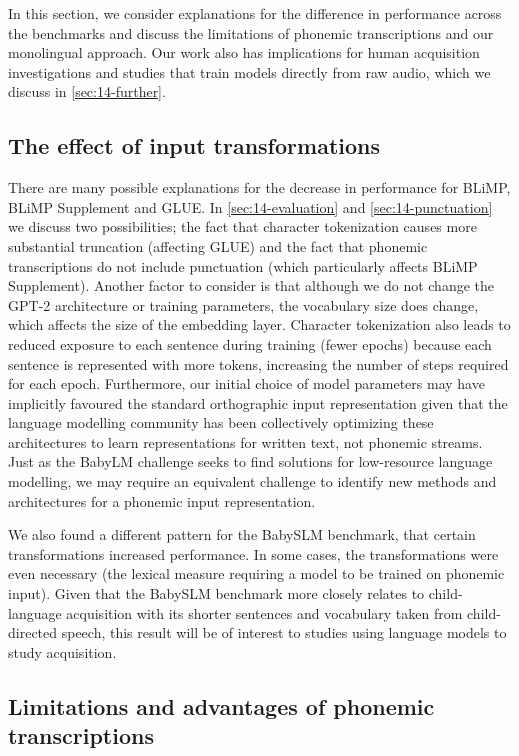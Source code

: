 In this section, we consider explanations for the difference in performance across the benchmarks and discuss the limitations of phonemic transcriptions and our monolingual approach. Our work also has implications for human acquisition investigations and studies that train models directly from raw audio, which we discuss in \cref{sec:14-further}.

\subsection{The effect of input transformations}

There are many possible explanations for the decrease in performance for BLiMP, BLiMP Supplement and GLUE. In \cref{sec:14-evaluation} and \cref{sec:14-punctuation} we discuss two possibilities; the fact that character tokenization causes more substantial truncation (affecting GLUE) and the fact that phonemic transcriptions do not include punctuation (which particularly affects BLiMP Supplement). Another factor to consider is that although we do not change the GPT-2 architecture or training parameters, the vocabulary size does change, which affects the size of the embedding layer. Character tokenization also leads to reduced exposure to each sentence during training (fewer epochs) because each sentence is represented with more tokens, increasing the number of steps required for each epoch. Furthermore, our initial choice of model parameters may have implicitly favoured the standard orthographic input representation given that the language modelling community has been collectively optimizing these architectures to learn representations for written text, not phonemic streams. Just as the BabyLM challenge seeks to find solutions for low-resource language modelling, we may require an equivalent challenge to identify new methods and architectures for a phonemic input representation. 

We also found a different pattern for the BabySLM benchmark, that certain transformations increased performance. In some cases, the transformations were even necessary (the lexical measure requiring a model to be trained on phonemic input). Given that the BabySLM benchmark more closely relates to child-language acquisition with its shorter sentences and vocabulary taken from child-directed speech, this result will be of interest to studies using language models to study acquisition.

\subsection{Limitations and advantages of phonemic transcriptions}
\label{sec:14-phonemeslimitations}

